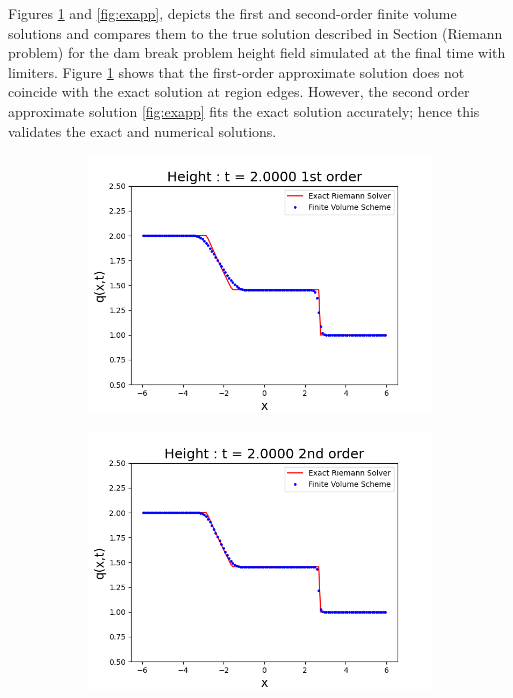 \documentclass[11pt,a4paper]{article}
\begin{document}
Figures \ref{fig:exap} and \ref{fig:exapp}, depicts the first and second-order finite volume solutions and compares them to the true solution described in Section (Riemann problem) for the dam break problem height field simulated at the final time with limiters. Figure \ref{fig:exap}  shows that the first-order approximate solution does not coincide with the exact solution at region edges. However, the second order approximate solution \ref{fig:exapp}  fits the exact solution accurately; hence this validates the exact and numerical solutions.
	\begin{figure}[H]
		\begin{subfigure}[b]{0.5\textwidth}
			\centering
			\includegraphics[width=1.0\linewidth]{images/exap}
			\caption{}
			\label{fig:exap}
		\end{subfigure}
		\begin{subfigure}[b]{0.5\textwidth}
			\centering
			\includegraphics[width=1.0\linewidth]{images/exapp}

\end{subfigure}
\end{figure}
\end{document}
